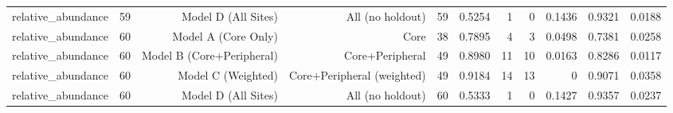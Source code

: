 {\begin{longtable}{lrrrrrrrrrr}
  relative\_abundance & 59 & Model D (All Sites) & All (no holdout) & 59 & 0.5254 & 1 & 0 & 0.1436 & 0.9321 & 0.0188 \\
  relative\_abundance & 60 & Model A (Core Only) & Core & 38 & 0.7895 & 4 & 3 & 0.0498 & 0.7381 & 0.0258 \\
  relative\_abundance & 60 & Model B (Core+Peripheral) & Core+Peripheral & 49 & 0.8980 & 11 & 10 & 0.0163 & 0.8286 & 0.0117 \\
  relative\_abundance & 60 & Model C (Weighted) & Core+Peripheral (weighted) & 49 & 0.9184 & 14 & 13 & 0 & 0.9071 & 0.0358 \\
  relative\_abundance & 60 & Model D (All Sites) & All (no holdout) & 60 & 0.5333 & 1 & 0 & 0.1427 & 0.9357 & 0.0237 \\
\end{longtable}
}
